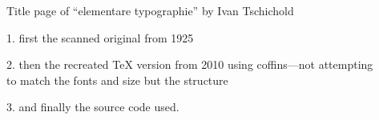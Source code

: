 \documentclass{article}
\begin{document}
\vspace*{3cm}
\begin{center}
  {\Large Title page of ``elementare typographie'' by Ivan Tschichold\par}

\large
\vspace*{1cm}

  1. first the scanned original from 1925

\vspace*{6mm}

  2. then the recreated \TeX{} version from 2010 using coffins---not
     attempting\\ to match the fonts and size but the structure

\vspace*{6mm}

  3. and finally the source code used.

\end{center}

\newpage


\begin{center}
  \null
\end{center}
\end{document}

